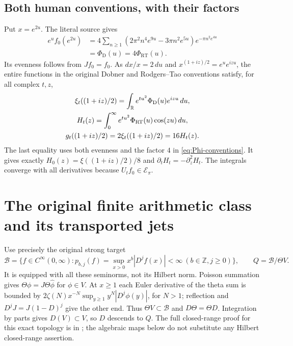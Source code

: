 \documentclass[11pt]{article}
\newcommand{\B}{\mathscr B}\newcommand{\Epi}{\mathscr E_\pi}
\begin{document}
\subsection{Both human conventions, with their factors}
Put $x=e^{2u}$. The literal source gives
\begin{equation}\label{eq:Phi-conventions}
\begin{split}
e^u f_0(e^{2u})
&=4\sum_{n\geq1}(2\pi^2n^4e^{9u}-3\pi n^2e^{5u})
e^{-\pi n^2e^{4u}}\\
&=\Phi_{\mathrm D}(u)=4\Phi_{\mathrm{RT}}(u).
\end{split}
\end{equation}
Its evenness follows from $Jf_0=f_0$. As $dx/x=2\,du$ and
$x^{(1+iz)/2}=e^ue^{izu}$, the entire functions in the original
Dobner and Rodgers--Tao conventions satisfy, for all complex $t,z$,
\begin{equation}\label{eq:constants}
\begin{gathered}
\xi_t((1+iz)/2)=\int_\mathbb R e^{tu^2}\Phi_{\mathrm D}(u)e^{izu}\,du,\\
H_t(z)=\int_0^\infty e^{tu^2}\Phi_{\mathrm{RT}}(u)\cos(zu)\,du,\\
g_t((1+iz)/2)=2\xi_t((1+iz)/2)=16H_t(z).
\end{gathered}
\end{equation}
The last equality uses both evenness and the factor $4$ in
\eqref{eq:Phi-conventions}. It gives exactly
$H_0(z)=\xi((1+iz)/2)/8$ and $\partial_tH_t=-\partial_z^2H_t$.
The integrals converge with all derivatives because $U_tf_0\in\Epi$.

\section{The original finite arithmetic class and its transported jets}

Use precisely the original strong target
\begin{equation}\label{eq:B}
\B=\{f\in C^\infty(0,\infty):
p_{b,j}(f)=\sup_{x>0}x^b|D^jf(x)|<\infty
\ (b\in\mathbb Z,j\geq0)\},\qquad Q=\B/\Theta V.
\end{equation}
It is equipped with all these seminorms, not its Hilbert norm.
Poisson summation gives $\Theta\phi=J\Theta\widehat\phi$ for
$\phi\in V$. At $x\geq1$ each Euler derivative of the theta sum
is bounded by $2\zeta(N)x^{-N}\sup_{y\geq1}y^N|D^j\phi(y)|$,
for $N>1$; reflection and $D^jJ=J(1-D)^j$ give the other end.
Thus $\Theta V\subset\B$ and $D\Theta=\Theta D$.
Integration by parts gives $D(V)\subset V$, so $D$ descends to $Q$.
The full closed-range proof for this exact topology is in
\cite{Closed}; the algebraic maps below do not substitute any
Hilbert closed-range assertion.
\end{document}
